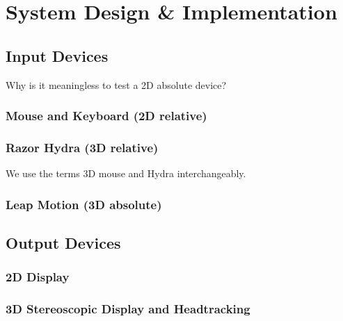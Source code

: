 \section{System Design \& Implementation}\label{sec:design}



\subsection{Input Devices}

Why is it meaningless to test a 2D absolute device?

\subsubsection{Mouse and Keyboard (2D relative)}

\subsubsection{Razor Hydra (3D relative)}

We use the terms 3D mouse and Hydra interchangeably.

\subsubsection{Leap Motion (3D absolute)}


\subsection{Output Devices}

\subsubsection{2D Display}

\subsubsection{3D Stereoscopic Display and Headtracking}
